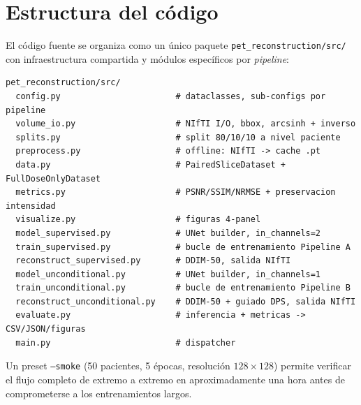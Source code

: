 \section{Estructura del código}
\label{sec:pet-codigo}

El código fuente se organiza como un único paquete
\texttt{pet\_reconstruction/src/} con infraestructura compartida
y módulos específicos por \textit{pipeline}:

\begin{verbatim}
pet_reconstruction/src/
  config.py                       # dataclasses, sub-configs por pipeline
  volume_io.py                    # NIfTI I/O, bbox, arcsinh + inverso
  splits.py                       # split 80/10/10 a nivel paciente
  preprocess.py                   # offline: NIfTI -> cache .pt
  data.py                         # PairedSliceDataset + FullDoseOnlyDataset
  metrics.py                      # PSNR/SSIM/NRMSE + preservacion intensidad
  visualize.py                    # figuras 4-panel
  model_supervised.py             # UNet builder, in_channels=2
  train_supervised.py             # bucle de entrenamiento Pipeline A
  reconstruct_supervised.py       # DDIM-50, salida NIfTI
  model_unconditional.py          # UNet builder, in_channels=1
  train_unconditional.py          # bucle de entrenamiento Pipeline B
  reconstruct_unconditional.py    # DDIM-50 + guiado DPS, salida NIfTI
  evaluate.py                     # inferencia + metricas -> CSV/JSON/figuras
  main.py                         # dispatcher
\end{verbatim}

Un preset \texttt{--smoke} (50 pacientes, 5 épocas, resolución
$128 \times 128$) permite verificar el flujo completo de extremo
a extremo en aproximadamente una hora antes de comprometerse a
los entrenamientos largos.
